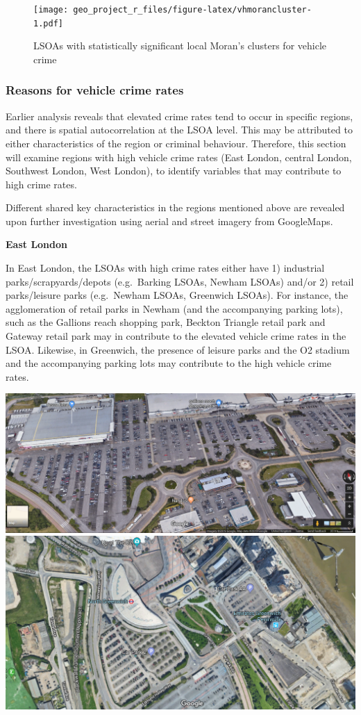 \documentclass[]{article}
\theoremstyle{definition}
\theoremstyle{definition}
\theoremstyle{definition}
\theoremstyle{remark}
\begin{document}
\begin{figure}
\centering
\texttt{[image: geo\_project\_r\_files/figure-latex/vhmorancluster-1.pdf]}
\caption{\label{fig:vhmorancluster}LSOAs with statistically significant
local Moran's clusters for vehicle crime}
\end{figure}

\subsubsection{Reasons for vehicle crime
rates}\label{reasons-for-vehicle-crime-rates}

Earlier analysis reveals that elevated crime rates tend to occur in
specific regions, and there is spatial autocorrelation at the LSOA
level. This may be attributed to either characteristics of the region or
criminal behaviour. Therefore, this section will examine regions with
high vehicle crime rates (East London, central London, Southwest London,
West London), to identify variables that may contribute to high crime
rates.

Different shared key characteristics in the regions mentioned above are
revealed upon further investigation using aerial and street imagery from
GoogleMaps.

\textbf{East London}

In East London, the LSOAs with high crime rates either have 1)
industrial parks/scrapyards/depots (e.g.~Barking LSOAs, Newham LSOAs)
and/or 2) retail parks/leisure parks (e.g.~Newham LSOAs, Greenwich
LSOAs). For instance, the agglomeration of retail parks in Newham (and
the accompanying parking lots), such as the Gallions reach shopping
park, Beckton Triangle retail park and Gateway retail park may in
contribute to the elevated vehicle crime rates in the LSOA. Likewise, in
Greenwich, the presence of leisure parks and the O2 stadium and the
accompanying parking lots may contribute to the high vehicle crime
rates.

\includegraphics{pictures/Newhamshopping.png}
\includegraphics{pictures/GreenwichO2carpark.png}
\end{document}
